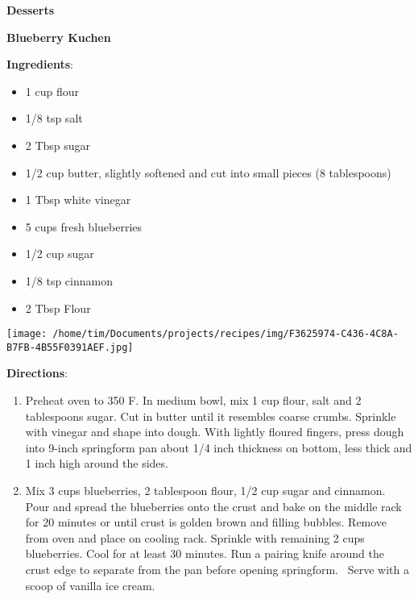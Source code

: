 \documentclass[11pt, twoside, openany]{book}
\begin{document}
{\newpage \LARGE \textbf{Desserts}} \label{desserts}\\
\noindent\begin{minipage}[t]{\linewidth}%
{\Large\textbf{Blueberry Kuchen}} \label{blueberry-kuchen}\hfill\textit{}\\
\noindent\begin{minipage}[t]{0.78\linewidth}%
\textbf{Ingredients}:\vspace{-3mm}
\begin{multicols}{2}
\begin{itemize}\setlength\itemsep{-1mm}
\item 1 cup flour
\item 1/8 tsp salt
\item 2 Tbsp sugar
\item 1/2 cup butter, slightly softened and cut into small pieces (8 tablespoons)
\item 1 Tbsp white vinegar
\item 5 cups fresh blueberries
\item 1/2 cup sugar
\item 1/8 tsp cinnamon
\item 2 Tbsp Flour
\end{itemize}
\end{multicols}
\end{minipage}
\noindent\begin{minipage}[t]{0.18\linewidth}
\centering \strut\vspace*{-\baselineskip}\newline
\texttt{[image: /home/tim/Documents/projects/recipes/img/F3625974-C436-4C8A-B7FB-4B55F0391AEF.jpg]}\\
\end{minipage}\vspace{3mm}
\textbf{Directions}:
\vspace{-3mm}\begin{enumerate}\setlength\itemsep{-1mm}
\item Preheat oven to 350 F. In medium bowl, mix 1 cup flour, salt and 2 tablespoons sugar. Cut in butter until it resembles coarse crumbs. Sprinkle with vinegar and shape into dough. With lightly floured fingers, press dough into 9-inch springform pan about 1/4 inch thickness on bottom, less thick and 1 inch high around the sides.
\item Mix 3 cups blueberries, 2 tablespoon flour, 1/2 cup sugar and cinnamon. Pour and spread the blueberries onto the crust and bake on the middle rack for 20 minutes or until crust is golden brown and filling bubbles. Remove from oven and place on cooling rack. Sprinkle with remaining 2 cups blueberries. Cool for at least 30 minutes. Run a pairing knife around the crust edge to separate from the pan before opening springform.  Serve with a scoop of vanilla ice cream.
\end{enumerate}
\end{minipage}\vspace{8mm}
\end{document}
